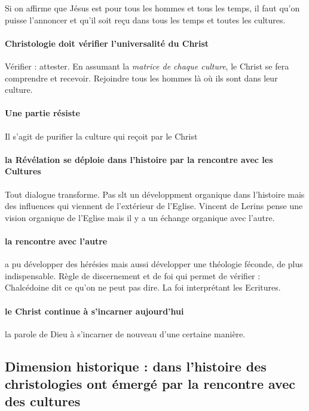 \begin{Synthesis}
    Si on affirme que Jésus est pour tous les hommes et tous les temps, il faut qu'on puisse l'annoncer et qu'il soit reçu dans tous les temps et toutes les cultures.
\end{Synthesis}


\paragraph{Christologie doit vérifier l'universalité du Christ} Vérifier : attester. En assumant la \textit{matrice de chaque culture}, le Christ se fera comprendre et recevoir. Rejoindre tous les hommes là où ils sont dans leur culture. 

\paragraph{Une partie résiste} Il s'agit de purifier la culture qui reçoit par le Christ

\paragraph{la Révélation se déploie dans l'histoire par la rencontre avec les Cultures} Tout dialogue transforme. Pas slt un développment organique dans l'histoire mais des influences qui viennent de l'extérieur de l'Eglise. Vincent de Lerins pense une vision organique de l'Eglise mais il y a un échange organique avec l'autre.

\paragraph{la rencontre avec l'autre} a pu développer des hérésies mais aussi développer une théologie féconde, de plus indispensable. 
Règle de discernement et de foi qui permet de vérifier : Chalcédoine dit ce qu'on ne peut pas dire. La foi interprétant les Ecritures.

\paragraph{le Christ continue à s'incarner aujourd'hui} la parole de Dieu à s'incarner de nouveau d'une certaine manière. 
 
\subsection{Dimension historique : dans l’histoire des christologies ont émergé par la rencontre
avec des cultures}


